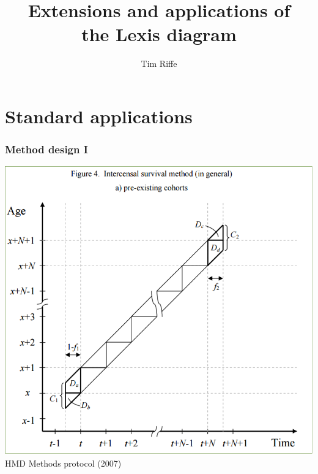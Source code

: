 \documentclass[20pt]{beamer}
\title{Extensions and applications of \\ the Lexis diagram}
\subtitle{Tim Riffe}		%
\begin{document}

\begin{frame}
	\titlepage
\end{frame}



%
\section{Standard applications}


\begin{frame}
\frametitle{Method design I}
\includegraphics[scale=.65]{Figures/HMD_MPv5Fig4.png}\\
HMD Methods protocol (2007)
\end{frame}
\end{document}
